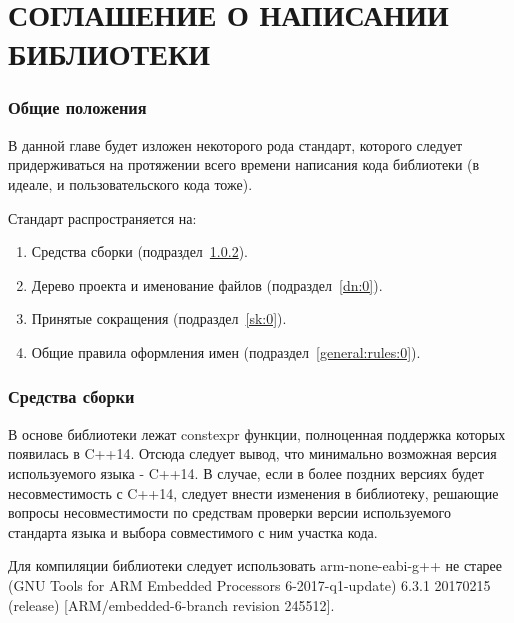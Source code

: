 \chapter{СОГЛАШЕНИЕ О НАПИСАНИИ БИБЛИОТЕКИ}
\subsection{Общие положения}
В данной главе будет изложен некоторого рода стандарт, которого следует придерживаться на протяжении всего времени написания кода библиотеки (в идеале, и пользовательского кода тоже).

Стандарт распространяется на:
\begin{enumerate}
	\item Средства сборки (подраздел~\ref{compgcc:0}).
	\item Дерево проекта и именование файлов (подраздел~\ref{dn:0}).
	\item Принятые сокращения (подраздел~\ref{sk:0}).
	\item Общие правила оформления имен (подраздел~\ref{general:rules:0}).
\end{enumerate}

\subsection{Средства сборки}
\label{compgcc:0}
В основе библиотеки лежат constexpr функции, полноценная поддержка которых появилась в C++14. Отсюда следует вывод, что минимально возможная версия используемого языка - C++14. В случае, если в более поздних версиях будет несовместимость с C++14, следует внести изменения в библиотеку, решающие вопросы несовместимости по средствам проверки версии используемого стандарта языка и выбора совместимого с ним участка кода.

Для компиляции библиотеки следует использовать arm-none-eabi-g++ не старее (GNU Tools for ARM Embedded Processors 6-2017-q1-update) 6.3.1 20170215 (release) [ARM/embedded-6-branch revision 245512].

